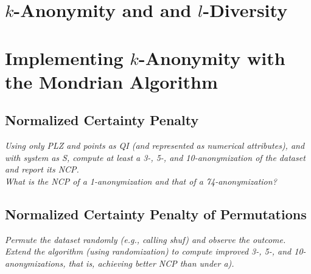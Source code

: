 \documentclass{report}
\begin{document}
	\section{$k$-Anonymity and and $l$-Diversity}
	\startsection
	\closesection
	
	\section{Implementing $k$-Anonymity with the Mondrian Algorithm}
	\startsection
		\renewcommand{\thesubsection}{\thesection.\alph{subsection}}
		\hfill \vspace{-1cm}
		
		\subsection{Normalized Certainty Penalty}
		\textit{Using only PLZ and points as QI (and represented as numerical attributes), and with system as S, compute at least a 3-, 5-, and 10-anonymization of the dataset and report its NCP. \\ What is the NCP of a 1-anonymization and that of a 74-anonymization?}
		\startsubsection
		\closesection
		
		\subsection{Normalized Certainty Penalty of Permutations}
		\textit{Permute the dataset randomly (e.g., calling shuf) and observe the outcome. Extend the algorithm (using randomization) to compute improved 3-, 5-, and 10-anonymizations, that is, achieving better NCP than under a).}
		\startsubsection
		\closesection
	\closesection
\end{document}
